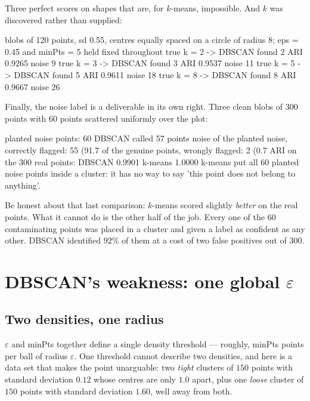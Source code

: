 \documentclass[11pt]{article}
\begin{document}
Three perfect scores on shapes that are, for $k$-means, impossible. And $k$
was discovered rather than supplied:

\begin{codeout}
blobs of 120 points, sd 0.55, centres equally spaced on a circle of radius 8;
eps = 0.45 and minPts = 5 held fixed throughout
  true k = 2  ->  DBSCAN found 2   ARI 0.9265   noise  9
  true k = 3  ->  DBSCAN found 3   ARI 0.9537   noise 11
  true k = 5  ->  DBSCAN found 5   ARI 0.9611   noise 18
  true k = 8  ->  DBSCAN found 8   ARI 0.9667   noise 26
\end{codeout}

Finally, the noise label is a deliverable in its own right. Three clean blobs
of $300$ points with $60$ points scattered uniformly over the plot:

\begin{codeout}
  planted noise points: 60   DBSCAN called 57 points noise
  of the planted noise, correctly flagged: 55 (91.7%
  of the genuine points, wrongly flagged:   2 (0.7%
  ARI on the 300 real points: DBSCAN 0.9901   k-means 1.0000
  k-means put all 60 planted noise points inside a cluster: it has
  no way to say 'this point does not belong to anything'.
\end{codeout}

Be honest about that last comparison: $k$-means scored slightly \emph{better}
on the real points. What it cannot do is the other half of the job. Every one
of the $60$ contaminating points was placed in a cluster and given a label as
confident as any other. DBSCAN identified $92\%$ of them at a cost of two
false positives out of $300$.

\section{DBSCAN's weakness: one global $\varepsilon$}
\label{sec:eps}

\subsection{Two densities, one radius}

$\varepsilon$ and minPts together define a single density threshold ---
roughly, minPts points per ball of radius $\varepsilon$. One threshold cannot
describe two densities, and here is a data set that makes the point
unarguable: two \emph{tight} clusters of $150$ points with standard deviation
$0.12$ whose centres are only $1.0$ apart, plus one \emph{loose} cluster of
$150$ points with standard deviation $1.60$, well away from both.
\end{document}
